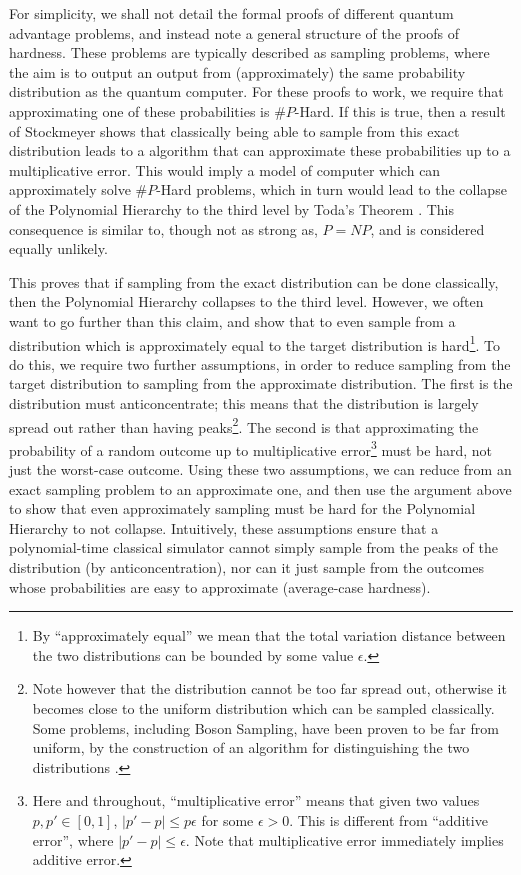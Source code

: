 For simplicity, we shall not detail the formal proofs of different quantum advantage problems, and instead note a general structure of the proofs of hardness. These problems are typically described as sampling problems, where the aim is to output an output from (approximately) the same probability distribution as the quantum computer. For these proofs to work, we require that approximating one of these probabilities is $\#P$-Hard. If this is true, then a result of Stockmeyer \cite{stockmeyer1983} shows that classically being able to sample from this exact distribution leads to a algorithm that can approximate these probabilities up to a multiplicative error. This would imply a model of computer which can approximately solve $\#P$-Hard problems, which in turn would lead to the collapse of the Polynomial Hierarchy to the third level by Toda's Theorem \cite{toda1991}. This consequence is similar to, though not as strong as, $P=NP$, and is considered equally unlikely.

This proves that if sampling from the exact distribution can be done classically, then the Polynomial Hierarchy collapses to the third level. However, we often want to go further than this claim, and show that to even sample from a distribution which is approximately equal to the target distribution is hard\footnote{By ``approximately equal'' we mean that the total variation distance between the two distributions can be bounded by some value $\epsilon$.}. To do this, we require two further assumptions, in order to reduce sampling from the target distribution to sampling from the approximate distribution. The first is the distribution must anticoncentrate; this means that the distribution is largely spread out rather than having peaks\footnote{Note however that the distribution cannot be too far spread out, otherwise it becomes close to the uniform distribution which can be sampled classically. Some problems, including Boson Sampling, have been proven to be far from uniform, by the construction of an algorithm for distinguishing the two distributions \cite{aaronson2014}.}. The second is that approximating the probability of a random outcome up to multiplicative error\footnote{Here and throughout, ``multiplicative error'' means that given two values $p, p' \in [0,1]$, $|p'-p|\leq p\epsilon$ for some $\epsilon > 0$. This is different from ``additive error'', where $|p'-p|\leq \epsilon$. Note that multiplicative error immediately implies additive error.} must be hard, not just the worst-case outcome. Using these two assumptions, we can reduce from an exact sampling problem to an approximate one, and then use the argument above to show that even approximately sampling must be hard for the Polynomial Hierarchy to not collapse. Intuitively, these assumptions ensure that a polynomial-time classical simulator cannot simply sample from the peaks of the distribution (by anticoncentration), nor can it just sample from the outcomes whose probabilities are easy to approximate (average-case hardness).

